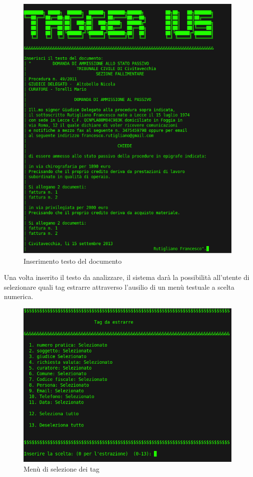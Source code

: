 \begin{figure}[H]
	\includegraphics[width=1\textwidth]{img/interfaces/CLI-document.png}
	\caption[Schermata CLI document]{Inserimento testo del documento}
	\label{CLI-doc}
\end{figure}

Una volta inserito il testo da analizzare, il sistema darà la possibilità all'utente di selezionare quali tag estrarre attraverso l'ausilio di un menù testuale a scelta numerica.

\begin{figure}[H]
	\includegraphics[width=1\textwidth]{img/interfaces/CLI-tagSelect.png}
	\caption[Schermata CLI tag select]{Menù di selezione dei tag}
	\label{CLI-tagSelect}
\end{figure}

